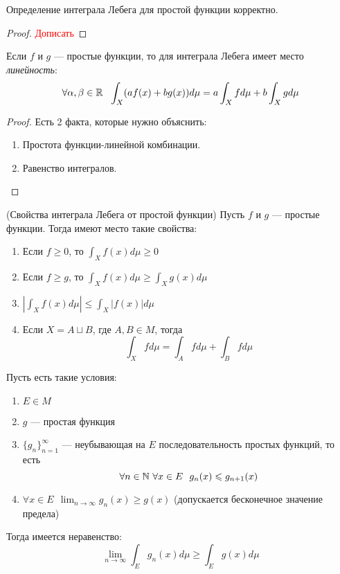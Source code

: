 \begin{proposition}
	Определение интеграла Лебега для простой функции корректно.
\end{proposition}

\begin{proof}
	\textcolor{red}{Дописать}
\end{proof}

\begin{theorem}
	Если $f$ и $g$ --- простые функции, то для интеграла Лебега имеет место \textit{линейность}:
	\[
		\forall \alpha, \beta \in \mathbb{R}\ \ \int_X (af(x) + bg(x))d\mu = a \int_X fd\mu + b \int_X gd\mu
	\]
\end{theorem}

\begin{proof}
	Есть 2 факта, которые нужно объяснить:
	\begin{enumerate}
		\item Простота функции-линейной комбинации. 
		
		\item Равенство интегралов.
	\end{enumerate}
\end{proof}

\begin{theorem} (Свойства интеграла Лебега от простой функции)
	Пусть $f$ и $g$ --- простые функции. Тогда имеют место такие свойства:
	\begin{enumerate}
		\item Если $f \ge 0$, то $\int_X f(x)d\mu \ge 0$
		
		\item Если $f \ge g$, то $\int_X f(x)d\mu \ge \int_X g(x)d\mu$
		
		\item $\left|\int_X f(x)d\mu\right| \le \int_X |f(x)|d\mu$
		
		\item Если $X = A \sqcup B$, где $A, B \in M$, тогда
		\[
			\int_X fd\mu = \int_A fd\mu + \int_B fd\mu
		\]
	\end{enumerate}
\end{theorem}

\begin{theorem}
	Пусть есть такие условия:
	\begin{enumerate}
		\item $E \in M$
		
		\item $g$ --- простая функция
		
		\item $\{g_n\}_{n = 1}^\infty$ --- неубывающая на $E$ последовательность простых функций, то есть
		\[
			\forall n \in \mathbb{N}\ \forall x \in E\ \ g_n(x) \leqslant g_{n + 1}(x)
		\]
		
		\item $\forall x \in E\ \ \lim_{n \to \infty} g_n(x) \ge g(x)$ (допускается бесконечное значение предела)
	\end{enumerate}
	Тогда имеется неравенство:
	\[
		\lim_{n \to \infty} \int_E g_n(x)d\mu \ge \int_E g(x)d\mu
	\]
\end{theorem}

